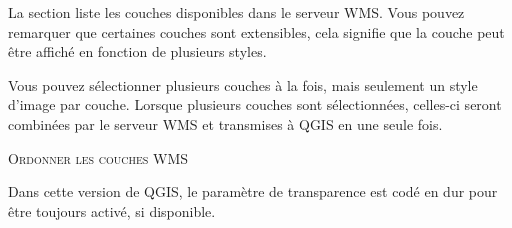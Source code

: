 
La section  liste les couches disponibles dans le serveur WMS. Vous
pouvez remarquer que certaines couches sont extensibles, cela signifie que la
couche peut \^etre affich\'e en fonction de plusieurs styles.

Vous pouvez s\'electionner plusieurs couches \`a la fois, mais seulement un style 
d'image par couche. Lorsque plusieurs couches sont s\'electionn\'ees, celles-ci 
seront combin\'ees par le serveur WMS et transmises \`a QGIS en une seule fois.

\begin{Astuce}[ht]\caption{\textsc{Ordonner les couches WMS}}
\end{Astuce}

\label{ogc-wms-transparency}

Dans cette version de QGIS, le param\`etre de transparence est cod\'e en dur pour 
\^etre toujours activ\'e, si disponible.

